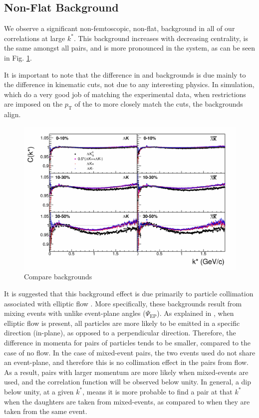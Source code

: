 \documentclass[../AnalysisNoteJBuxton.tex]{subfiles}
\begin{document}
\subsection{Non-Flat Background}
\label{NonFlatBackground}

We observe a significant non-femtoscopic, non-flat, background in all of our correlations at large $k^{*}$.  This background increases with decreasing centrality, is the same amongst all \LamKpm pairs, and is more pronounced in the \LamKs system, as can be seen in Fig. \ref{fig:CompareAllBgds}.  

It is important to note that the difference in \LamKpm and \LamKs backgrounds is due mainly to the difference in kinematic cuts, not due to any interesting physics.  In simulation, which do a very good job of matching the experimental data, when restrictions are imposed on the $p_{\textrm{T}}$ of the \Ks to more closely match the \Kpm cuts, the backgrounds align.

\begin{figure}[h]
  \centering
  \includegraphics[width=\textwidth]{5_Fitting/Figures/CompareLamKchAvgToLamK0_wIndivKch_0010_1030_3050.pdf}
  \caption[Compare Backgrounds]{Compare backgrounds}
  \label{fig:CompareAllBgds}
\end{figure}

It is suggested that this background effect is due primarily to particle collimation associated with elliptic flow \cite{Kisiel:2017}.  More specifically, these backgrounds result from mixing events with unlike event-plane angles ($\Psi_{\textrm{EP}}$).  As explained in \cite{Kisiel:2017}, when elliptic flow is present, all particles are more likely to be emitted in a specific direction (in-plane), as opposed to a perpendicular direction.  Therefore, the difference in momenta for pairs of particles tends to be smaller, compared to the case of no flow.  In the case of mixed-event pairs, the two events used do not share an event-plane, and therefore this is no collimation effect in the pairs from flow.  As a result, pairs with larger momentum are more likely when mixed-events are used, and the correlation function will be observed below unity.  In general, a dip below unity, at a given $k^{*}$, means it is more probable to find a pair at that $k^{*}$ when the daughters are taken from mixed-events, as compared to when they are taken from the same event.
\end{document}
